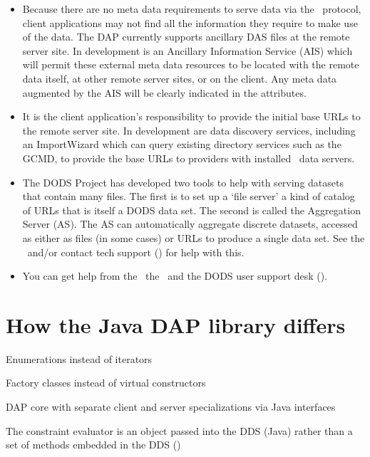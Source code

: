 \documentclass{dods-paper}
\begin{document}
\begin{itemize}
  
\item Because there are no meta data requirements to serve data via the
  \opendap\ protocol, client applications may not find all the
  information they require to make use of the data.  The DAP currently
  supports ancillary DAS files at the remote server site.  In
  development is an Ancillary Information Service (AIS) which will
  permit these external meta data resources to be located with the
  remote data itself, at other remote server sites, or on the client.
  Any meta data augmented by the AIS will be clearly indicated in the
  attributes.

\item It is the client application's responsibility to provide the
  initial base URLs to the remote server site.  In development are
  data discovery services, including an ImportWizard which can query
  existing directory services such as the GCMD, to provide the base
  URLs to providers with installed \opendap\ data servers.

\item The DODS Project has developed two tools to help with serving
  datasets that contain many files. The first is to set up a `file
  server' a kind of catalog of URLs that is itself a DODS data set.
  The second is called the Aggregation Server (AS). The AS can
  automatically aggregate discrete datasets, accessed as either as
  files (in some cases) or URLs to produce a single data set. See the
  \OPDhome\ and/or contact tech support (\OPDsupport) for help with
  this.

\item You can get help from the \OPDhome\, the \OPDtechList\
  and the DODS user support desk (\OPDsupport).
  
\end{itemize} 

\appendix

\section{How the Java DAP library differs}
\label{sec:javadap}

Enumerations instead of iterators

Factory classes instead of virtual constructors

DAP core with separate client and server specializations via Java interfaces

The constraint evaluator is an object passed into the DDS (Java) rather than
a set of methods embedded in the DDS (\Cpp)



   
\end{document}
